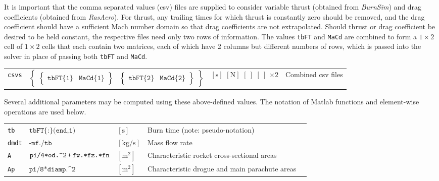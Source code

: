 \documentclass[11pt]{thesis}
\numberwithin{equation}{section}
\begin{document}
It is important that the comma separated values (csv) files are supplied to consider variable thrust (obtained from \textsl{BurnSim}) and drag coefficients (obtained from \textsl{RasAero}). For thrust, any trailing times for which thrust is constantly zero should be removed, and the drag coefficient should have a sufficient Mach number domain so that drag coefficients are not extrapolated. Should thrust or drag coefficient be desired to be held constant, the respective files need only two rows of information. The values \texttt{tbFT} and \texttt{MaCd} are combined to form a $1 \times 2$ cell of $1 \times 2$ cells that each contain two matrices, each of which have 2 columns but different numbers of rows, which is passed into the solver in place of passing both \texttt{tbFT} and \texttt{MaCd}.
\begin{longtable}[l]{l l l l}
\texttt{csvs} & $\begin{Bmatrix}\begin{Bmatrix}\texttt{tbFT\{1\}} & \texttt{MaCd\{1\}}\end{Bmatrix} & \begin{Bmatrix}\texttt{tbFT\{2\}} & \texttt{MaCd\{2\}}\end{Bmatrix}\end{Bmatrix}$ & $[\si{\s}]$ $[\si{\N}]$ $[\ ]$ $[\ ]$ $\times 2$ & Combined csv files
\end{longtable}

Several additional parameters may be computed using these above-defined values. The notation of Matlab functions and element-wise operations are used below.
\begin{longtable}[l]{l l l l l}
\texttt{tb} & $\texttt{tbFT\{:\}(end,1)}$ & $[\si{\s}]$ & Burn time (note: pseudo-notation) \\
\texttt{dmdt} & $\texttt{-mf./tb}$ & $[\si{\kg / \s}]$ & Mass flow rate \\
\texttt{A} & $\texttt{pi/4*od.\textasciicircum 2\,+\,fw.*fz.*fn}$ & $[\si{\m\squared}]$ & Characteristic rocket cross-sectional areas \\
\texttt{Ap} & $\texttt{pi/8*diamp.\textasciicircum 2}$ & $[\si{\m\squared}]$ & Characteristic drogue and main parachute areas
\end{longtable}
\end{document}
